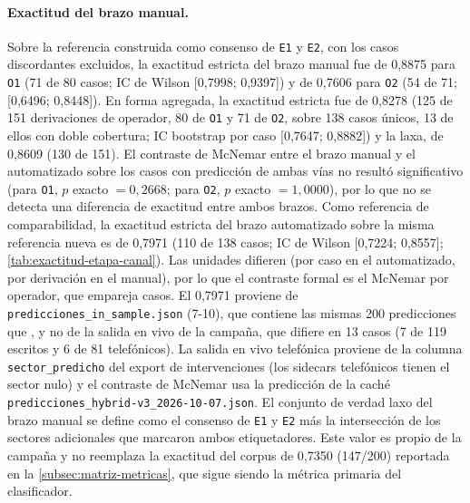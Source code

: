 \paragraph{Exactitud del brazo manual.} Sobre la referencia construida como consenso de \texttt{E1} y \texttt{E2}, con los casos discordantes excluidos, la exactitud estricta del brazo manual fue de 0,8875 para \texttt{O1} (71 de 80 casos; IC de Wilson [0,7998; 0,9397]) y de 0,7606 para \texttt{O2} (54 de 71; [0,6496; 0,8448]). En forma agregada, la exactitud estricta fue de 0,8278 (125 de 151 derivaciones de operador, 80 de \texttt{O1} y 71 de \texttt{O2}, sobre 138 casos únicos, 13 de ellos con doble cobertura; IC bootstrap por caso [0,7647; 0,8882]) y la laxa, de 0,8609 (130 de 151). El contraste de McNemar entre el brazo manual y el automatizado sobre los casos con predicción de ambas vías no resultó significativo (para \texttt{O1}, $p$ exacto $= 0,2668$; para \texttt{O2}, $p$ exacto $= 1,0000$), por lo que no se detecta una diferencia de exactitud entre ambos brazos. Como referencia de comparabilidad, la exactitud estricta del brazo automatizado sobre la misma referencia nueva es de 0,7971 (110 de 138 casos; IC de Wilson [0,7224; 0,8557]; \autoref{tab:exactitud-etapa-canal}). Las unidades difieren (por caso en el automatizado, por derivación en el manual), por lo que el contraste formal es el McNemar por operador, que empareja casos. El 0,7971 proviene de \texttt{predicciones\_in\_sample.json} (7-10), que contiene las mismas 200 predicciones que , y no de la salida en vivo de la campaña, que difiere en 13 casos (7 de 119 escritos y 6 de 81 telefónicos). La salida en vivo telefónica proviene de la columna \texttt{sector\_predicho} del export de intervenciones (los sidecars telefónicos tienen el sector nulo) y el contraste de McNemar usa la predicción de la caché \texttt{predicciones\_hybrid-v3\_2026-10-07.json}. El conjunto de verdad laxo del brazo manual se define como el consenso de \texttt{E1} y \texttt{E2} más la intersección de los sectores adicionales que marcaron ambos etiquetadores. Este valor es propio de la campaña y no reemplaza la exactitud del corpus de 0,7350 (147/200) reportada en la \autoref{subsec:matriz-metricas}, que sigue siendo la métrica primaria del clasificador.

